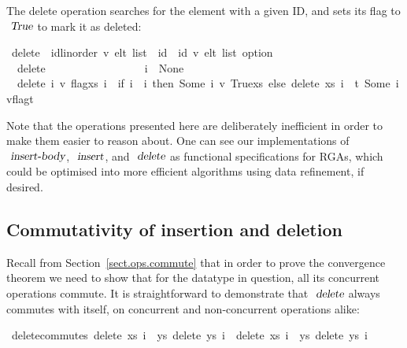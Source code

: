 The delete operation searches for the element with a given ID, and sets its flag to $\isa{True}$ to mark it as deleted:
\begin{isabelle}
\ delete\ {\isacharcolon}{\isacharcolon}\ {\isachardoublequoteopen}{\isacharparenleft}{\isacharprime}id{\isacharcolon}{\isacharcolon}{\isacharbraceleft}linorder{\isacharbraceright}{\isacharcomma}\ {\isacharprime}v{\isacharparenright}\ elt\ list\ {\isasymRightarrow}\ {\isacharprime}id\ {\isasymRightarrow}\ {\isacharparenleft}{\isacharprime}id{\isacharcomma}\ {\isacharprime}v{\isacharparenright}\ elt\ list\ option{\isachardoublequoteclose}\ \isanewline
\ \ {\isachardoublequoteopen}delete\ {\isacharbrackleft}{\isacharbrackright}\ \ \ \ \ \ \ \ \ \ \ \ \ \ \ \ \ i\ {\isacharequal}\ None{\isachardoublequoteclose}\ {\isacharbar}\isanewline
\ \ {\isachardoublequoteopen}delete\ {\isacharparenleft}{\isacharparenleft}i{\isacharprime}{\isacharcomma}\ v{\isacharcomma}\ flag{\isacharparenright}{\isacharhash}xs{\isacharparenright}\ i\ {\isacharequal}\ {\isacharparenleft}if\ i{\isacharprime}\ {\isacharequal}\ i\ then\ Some\ {\isacharparenleft}{\isacharparenleft}i{\isacharprime}{\isacharcomma}\ v{\isacharcomma}\ True{\isacharparenright}{\isacharhash}xs{\isacharparenright}\ else\ delete\ xs\ i\ {\isasymbind}\ {\isacharparenleft}{\isasymlambda}t{\isachardot}\ Some\ {\isacharparenleft}{\isacharparenleft}i{\isacharprime}{\isacharcomma}v{\isacharcomma}flag{\isacharparenright}{\isacharhash}t{\isacharparenright}{\isacharparenright}{\isacharparenright}{\isachardoublequoteclose}%
\end{isabelle}
Note that the operations presented here are deliberately inefficient in order to make them easier to reason about.
One can see our implementations of $\isa{insert-body}$, $\isa{insert}$, and $\isa{delete}$ as functional specifications for RGAs, which could be optimised into more efficient algorithms using data refinement, if desired.

\subsection{Commutativity of insertion and deletion}

Recall from Section~\ref{sect.ops.commute} that in order to prove the convergence theorem we need to show that for the datatype in question, all its concurrent operations commute.
It is straightforward to demonstrate that $\isa{delete}$ always commutes with itself, on concurrent and non-concurrent operations alike:
\begin{isabelle}
\ delete{\isacharunderscore}commutes{\isacharcolon}\ {\isachardoublequoteopen}delete\ xs\ i{}\ {\isasymbind}\ {\isacharparenleft}{\isasymlambda}ys{\isachardot}\ delete\ ys\ i{}{\isacharparenright}\ {\isacharequal}\ delete\ xs\ i{}\ {\isasymbind}\ {\isacharparenleft}{\isasymlambda}ys{\isachardot}\ delete\ ys\ i{}{\isacharparenright}{\isachardoublequoteclose}
\end{isabelle}


